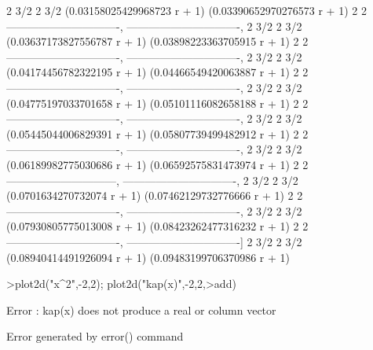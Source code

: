 \documentclass[a4paper,10pt]{article}
\begin{document}
\begin{eulernotebook}
\begin{euleroutput}
                        2     3/2                        2     3/2
  (0.03158025429968723 r  + 1)     (0.03390652970276573 r  + 1)
                 2                                2
  -------------------------------, -------------------------------, 
                        2     3/2                        2     3/2
  (0.03637173827556787 r  + 1)     (0.03898223363705915 r  + 1)
                 2                                2
  -------------------------------, -------------------------------, 
                        2     3/2                        2     3/2
  (0.04174456782322195 r  + 1)     (0.04466549420063887 r  + 1)
                 2                                2
  -------------------------------, -------------------------------, 
                        2     3/2                        2     3/2
  (0.04775197033701658 r  + 1)     (0.05101116082658188 r  + 1)
                 2                                2
  -------------------------------, -------------------------------, 
                        2     3/2                        2     3/2
  (0.05445044006829391 r  + 1)     (0.05807739499482912 r  + 1)
                 2                                2
  -------------------------------, -------------------------------, 
                        2     3/2                        2     3/2
  (0.06189982775030686 r  + 1)     (0.06592575831473974 r  + 1)
                2                                2
  ------------------------------, -------------------------------, 
                       2     3/2                        2     3/2
  (0.0701634270732074 r  + 1)     (0.07462129732776666 r  + 1)
                 2                                2
  -------------------------------, -------------------------------, 
                        2     3/2                        2     3/2
  (0.07930805775013008 r  + 1)     (0.08423262477316232 r  + 1)
                 2                                2
  -------------------------------, -------------------------------]
                        2     3/2                        2     3/2
  (0.08940414491926094 r  + 1)     (0.09483199706370986 r  + 1)
  
\end{euleroutput}
\begin{eulerprompt}
>plot2d("x^2",-2,2); plot2d("kap(x)",-2,2,>add)
\end{eulerprompt}
\begin{euleroutput}
  Error : kap(x) does not produce a real or column vector
  
  Error generated by error() command
  

\end{euleroutput}
\end{eulernotebook}
\end{document}
